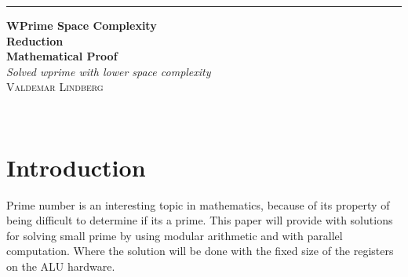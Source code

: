 \documentclass[12pt, oneside, onecolumn]{article}
\begin{document}
\begin{titlepage} %
	
	\raggedleft %
	
	\rule{1pt}{\textheight} %
	\hspace{0.05\textwidth} %
	\parbox[b]{0.75\textwidth}{ %
		
		{\Huge\bfseries WPrime Space Complexity\\  Reduction \\[0.5\baselineskip] Mathematical Proof}\\[2\baselineskip] %
		{\large\textit{Solved wprime with lower space complexity}}\\[4\baselineskip] %
		{\Large\textsc{Valdemar Lindberg}} %
		
		\vspace{0.5\textheight} %
		
		{\noindent }\\[\baselineskip] %
	}

\end{titlepage}

\newpage
{} %

\tableofcontents
\newpage
{} %

% 
\section{Introduction}
Prime number is an interesting topic in mathematics, because of its property of being difficult to determine if its a prime. This paper will provide with solutions for solving small prime by using modular arithmetic and with parallel computation. Where the solution will be done with the fixed size of the registers on the ALU hardware.
\end{document}
